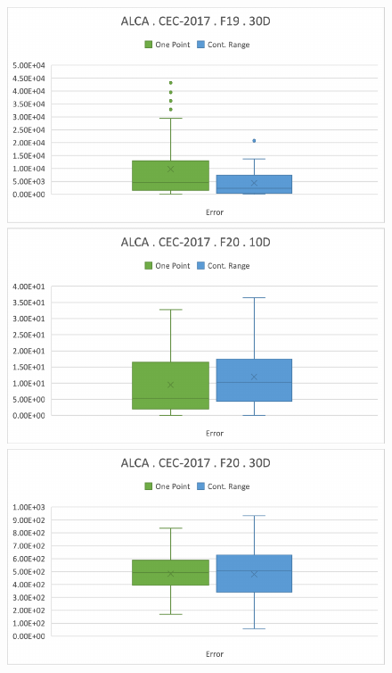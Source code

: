 \documentclass[graybox]{svmult}
\begin{document}
\begin{figure}[!ht]
\begin{minipage}[h]{0.49\linewidth}
        \end{minipage}
        \hfill
        \begin{minipage}[h]{0.49\linewidth}
            \includegraphics[width=1\linewidth]{img/fig_experiment_F19x30D.pdf} 
        \end{minipage}
        \vfill
        \vspace{0.05 cm}
        \begin{minipage}[h]{0.49\linewidth}
            \includegraphics[width=1\linewidth]{img/fig_experiment_F20x10D.pdf} 
        \end{minipage}
        \hfill
        \begin{minipage}[h]{0.49\linewidth}
            \includegraphics[width=1\linewidth]{img/fig_experiment_F20x30D.pdf} 
        \end{minipage}


\end{figure}
\end{document}
